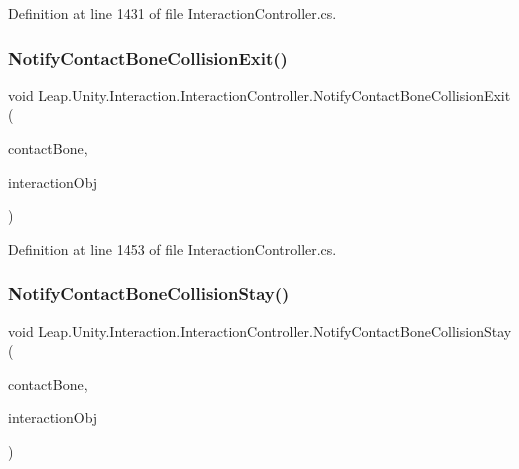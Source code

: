 Definition at line 1431 of file Interaction\+Controller.\+cs.

\mbox{\label{class_leap_1_1_unity_1_1_interaction_1_1_interaction_controller_a9bae79d10f8020e2f1179042f93e1f3c}} 
\subsubsection{\texorpdfstring{NotifyContactBoneCollisionExit()}{NotifyContactBoneCollisionExit()}}
{\footnotesize\ttfamily void Leap.\+Unity.\+Interaction.\+Interaction\+Controller.\+Notify\+Contact\+Bone\+Collision\+Exit (\begin{DoxyParamCaption}\item[{\mbox{\hyperlink{class_leap_1_1_unity_1_1_interaction_1_1_contact_bone}{Contact\+Bone}}}]{contact\+Bone,  }\item[{\mbox{\hyperlink{interface_leap_1_1_unity_1_1_interaction_1_1_i_interaction_behaviour}{I\+Interaction\+Behaviour}}}]{interaction\+Obj }\end{DoxyParamCaption})}



Definition at line 1453 of file Interaction\+Controller.\+cs.

\mbox{\label{class_leap_1_1_unity_1_1_interaction_1_1_interaction_controller_a84a7f5e9c214510936475e37c65f0a3c}} 
\subsubsection{\texorpdfstring{NotifyContactBoneCollisionStay()}{NotifyContactBoneCollisionStay()}}
{\footnotesize\ttfamily void Leap.\+Unity.\+Interaction.\+Interaction\+Controller.\+Notify\+Contact\+Bone\+Collision\+Stay (\begin{DoxyParamCaption}\item[{\mbox{\hyperlink{class_leap_1_1_unity_1_1_interaction_1_1_contact_bone}{Contact\+Bone}}}]{contact\+Bone,  }\item[{\mbox{\hyperlink{interface_leap_1_1_unity_1_1_interaction_1_1_i_interaction_behaviour}{I\+Interaction\+Behaviour}}}]{interaction\+Obj }\end{DoxyParamCaption})}



